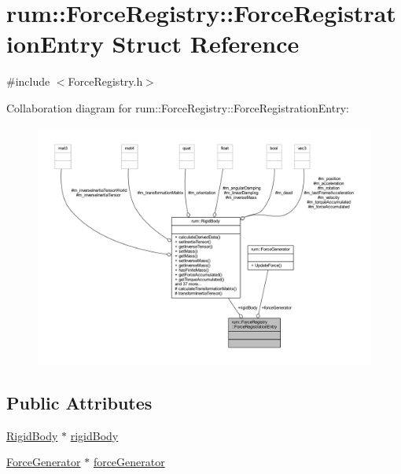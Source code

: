 \hypertarget{structrum_1_1_force_registry_1_1_force_registration_entry}{}\section{rum\+:\+:Force\+Registry\+:\+:Force\+Registration\+Entry Struct Reference}
\label{structrum_1_1_force_registry_1_1_force_registration_entry}


{\ttfamily \#include $<$Force\+Registry.\+h$>$}



Collaboration diagram for rum\+:\+:Force\+Registry\+:\+:Force\+Registration\+Entry\+:\nopagebreak
\begin{figure}[H]
\begin{center}
\leavevmode
\includegraphics[width=350pt]{structrum_1_1_force_registry_1_1_force_registration_entry__coll__graph}
\end{center}
\end{figure}
\subsection*{Public Attributes}
\begin{DoxyCompactItemize}
\item 
\hyperlink{classrum_1_1_rigid_body}{Rigid\+Body} $\ast$ \hyperlink{structrum_1_1_force_registry_1_1_force_registration_entry_a35ba48cd73a75a00b3f265517d598c60}{rigid\+Body}
\item 
\hyperlink{classrum_1_1_force_generator}{Force\+Generator} $\ast$ \hyperlink{structrum_1_1_force_registry_1_1_force_registration_entry_a869a20d3c38ba31167a2ddc29315c861}{force\+Generator}
\end{DoxyCompactItemize}


